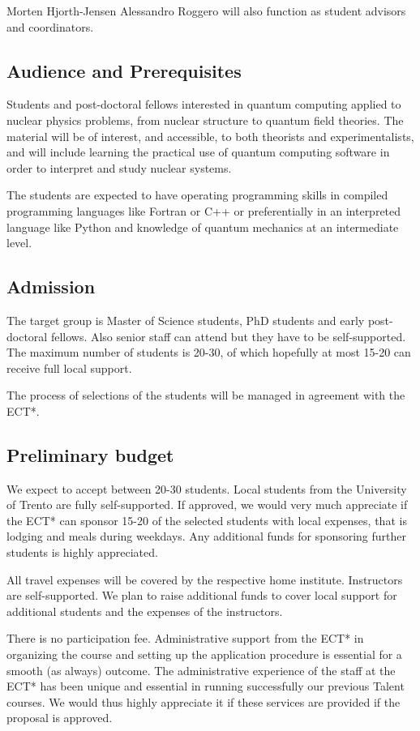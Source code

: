 \documentclass[twocolumn,superscriptaddress,amsmath,amssymb,
aps,floatfix]{revtex4-2}
\begin{document}
Morten Hjorth-Jensen Alessandro Roggero will also function as student
advisors and coordinators.

    \subsection{Audience and
Prerequisites}\label{audience-and-prerequisites}

Students and post-doctoral fellows interested in quantum computing
applied to nuclear physics problems, from nuclear structure to quantum
field theories. The material will be of interest, and accessible, to
both theorists and experimentalists, and will include learning the
practical use of quantum computing software in order to interpret and
study nuclear systems.

The students are expected to have operating programming skills in
compiled programming languages like Fortran or C++ or preferentially in
an interpreted language like Python and knowledge of quantum mechanics
at an intermediate level.

    \subsection{Admission}\label{admission}

The target group is Master of Science students, PhD students and early
post-doctoral fellows. Also senior staff can attend but they have to be
self-supported. The maximum number of students is 20-30, of which
hopefully at most 15-20 can receive full local support.

The process of selections of the students will be managed in agreement
with the ECT*.

    \subsection{Preliminary budget}\label{preliminary-budget}

We expect to accept between 20-30 students. Local students from the
University of Trento are fully self-supported. If approved, we would
very much appreciate if the ECT* can sponsor 15-20 of the selected
students with local expenses, that is lodging and meals during weekdays.
Any additional funds for sponsoring further students is highly
appreciated.

All travel expenses will be covered by the respective home institute.
Instructors are self-supported. We plan to raise additional funds to cover
local support for additional students and the expenses of the instructors.

There is no participation fee. Administrative support from the ECT* in
organizing the course and setting up the application procedure is
essential for a smooth (as always) outcome. The administrative
experience of the staff at the ECT* has been unique and essential in
running successfully our previous Talent courses. We would thus highly
appreciate it if these services are provided if the proposal is
approved.
\end{document}
